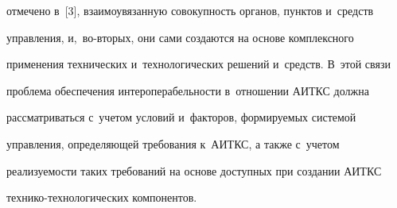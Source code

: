 отмечено в~[3], взаимоувязанную совокупность органов, пунктов и~средств 

управления, и,~во-вто\-рых, они сами создаются на основе комплексного 

применения технических и~технологических решений и~средств. В~этой связи 

проблема обеспечения интероперабельности в~отношении АИТКС должна 

рассматриваться с~учетом условий и~факторов, формируемых системой 

управления, определяющей требования к~АИТКС, а также с~учетом 

реализуемости таких требований на основе доступных при создании АИТКС  

тех\-ни\-ко-тех\-но\-ло\-ги\-че\-ских компонентов.




   

